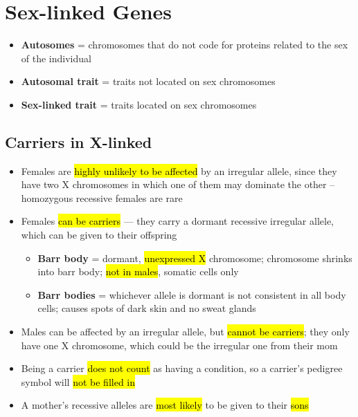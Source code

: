 \documentclass[a4paper,12pt]{article}
\begin{document}
\section{Sex-linked Genes}
\begin{itemize}
    \item{\textbf{Autosomes} = chromosomes that do not code for proteins related to the sex of the individual}
    \item{\textbf{Autosomal trait} = traits not located on sex chromosomes}
    \item{\textbf{Sex-linked trait} = traits located on sex chromosomes}
\end{itemize}

\subsection{Carriers in X-linked}
\begin{itemize}
    \item{
            Females are \hl{highly unlikely to be affected} by an irregular allele, since they have two X chromosomes in which one of them may dominate the other -- homozygous recessive females are rare}
    \item{Females \hl{can be carriers} --- they carry a dormant recessive irregular allele, which can be given to their offspring
            \begin{itemize}
                \item{\textbf{Barr body} = dormant, \hl{unexpressed X} chromosome; chromosome shrinks into barr body; \hl{not in males}, somatic cells only}
                \item{\textbf{Barr bodies} = whichever allele is dormant is not consistent in all body cells; causes spots of dark skin and no sweat glands}
            \end{itemize}
        }
    \item{Males can be affected by an irregular allele, but \hl{cannot be carriers}; they only have one X chromosome, which could be the irregular one from their mom}
    \item{Being a carrier \hl{does not count} as having a condition, so a carrier's pedigree symbol will \hl{not be filled in}}
    \item{A mother's recessive alleles are \hl{most likely} to be given to their \hl{sons}}
\end{itemize}

\pagebreak
\end{document}
